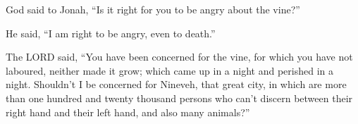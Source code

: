  God said to Jonah, ``Is it right for you to be angry
about the vine?''

He said, ``I am right to be angry, even to death.''

 The LORD said, ``You have been concerned for the vine,
for which you have not laboured, neither made it grow; which came up in
a night and perished in a night.  Shouldn't I be
concerned for Nineveh, that great city, in which are more than one
hundred and twenty thousand persons who can't discern between their
right hand and their left hand, and also many animals?''
